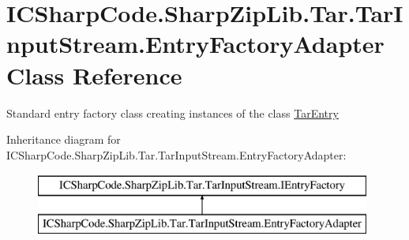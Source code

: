 \hypertarget{class_i_c_sharp_code_1_1_sharp_zip_lib_1_1_tar_1_1_tar_input_stream_1_1_entry_factory_adapter}{}\section{I\+C\+Sharp\+Code.\+Sharp\+Zip\+Lib.\+Tar.\+Tar\+Input\+Stream.\+Entry\+Factory\+Adapter Class Reference}
\label{class_i_c_sharp_code_1_1_sharp_zip_lib_1_1_tar_1_1_tar_input_stream_1_1_entry_factory_adapter}


Standard entry factory class creating instances of the class \hyperlink{class_i_c_sharp_code_1_1_sharp_zip_lib_1_1_tar_1_1_tar_entry}{Tar\+Entry}  


Inheritance diagram for I\+C\+Sharp\+Code.\+Sharp\+Zip\+Lib.\+Tar.\+Tar\+Input\+Stream.\+Entry\+Factory\+Adapter\+:\begin{figure}[H]
\begin{center}
\leavevmode
\includegraphics[height=2.000000cm]{class_i_c_sharp_code_1_1_sharp_zip_lib_1_1_tar_1_1_tar_input_stream_1_1_entry_factory_adapter}
\end{center}
\end{figure}
